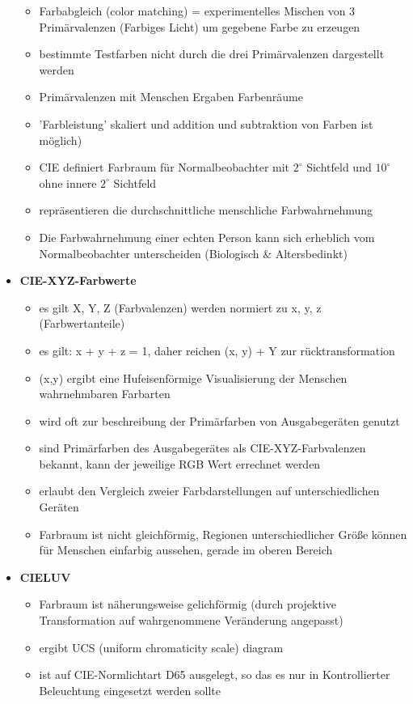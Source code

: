 \documentclass[11pt]{article}
\begin{document}
\begin{itemize}
    \begin{itemize}
        \item Farbabgleich (color matching) = experimentelles Mischen von 3 Primärvalenzen (Farbiges Licht) um gegebene Farbe zu erzeugen
        \item bestimmte Testfarben nicht durch die drei Primärvalenzen dargestellt werden
        \item  Primärvalenzen mit Menschen Ergaben Farbenräume
        \item 'Farbleistung' skaliert und addition und subtraktion von Farben ist möglich)
        \item CIE definiert Farbraum für Normalbeobachter mit $2^\circ$ Sichtfeld und $10^\circ$ ohne innere $2^\circ$ Sichtfeld
        \item repräsentieren die durchschnittliche menschliche Farbwahrnehmung
        \item Die Farbwahrnehmung einer echten Person kann sich erheblich vom Normalbeobachter unterscheiden (Biologisch \& Altersbedinkt)
    \end{itemize}
        \item \textbf{CIE-XYZ-Farbwerte}
        \begin{itemize}
            \item es gilt X, Y, Z (Farbvalenzen) werden normiert zu x, y, z (Farbwertanteile)
            \item es gilt: x + y + z = 1, daher reichen (x, y) + Y zur rücktransformation
            \item (x,y) ergibt eine Hufeisenförmige Visualisierung der Menschen wahrnehmbaren Farbarten
            \item wird oft zur beschreibung der Primärfarben von Ausgabegeräten genutzt
            \item sind Primärfarben des Ausgabegerätes als CIE-XYZ-Farbvalenzen bekannt, kann der jeweilige RGB Wert errechnet werden
            \item erlaubt den Vergleich zweier Farbdarstellungen auf unterschiedlichen Geräten
            \item Farbraum ist nicht gleichförmig, Regionen unterschiedlicher Größe können für Menschen einfarbig aussehen, gerade im oberen Bereich
        \end{itemize}
    \item \textbf{CIELUV}
    \begin{itemize}
        \item Farbraum ist näherungsweise gelichförmig (durch projektive Transformation auf wahrgenommene Veränderung angepasst)
        \item ergibt UCS (uniform chromaticity scale) diagram
        \item ist auf CIE-Normlichtart D65 ausgelegt, so das es nur in Kontrollierter Beleuchtung eingesetzt werden sollte
        

\end{itemize}
\end{itemize}
\end{document}
